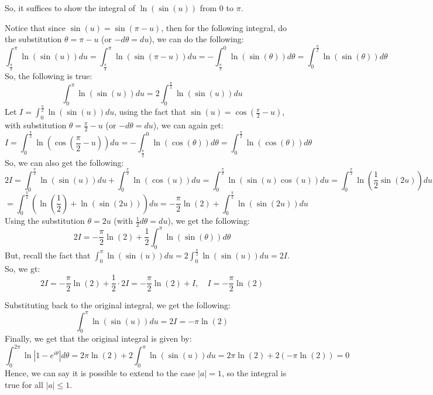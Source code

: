 \documentclass{article}
\begin{document}
So, it suffices to show the integral of $\ln(\sin(u))$ from $0$ to $\pi$.

\hfil

Notice that since $\sin(u)=\sin(\pi-u)$, then for the following integral, do the substitution $\theta=\pi-u$ (or $-d\theta = du$), we can do the following:
$$\int_{\frac{\pi}{2}}^{\pi}\ln(\sin(u))du = \int_{\frac{\pi}{2}}^{\pi}\ln(\sin(\pi-u))du = -\int_{\frac{\pi}{2}}^{0}\ln(\sin(\theta))d\theta = \int_{0}^{\frac{\pi}{2}}\ln(\sin(\theta))d\theta$$
So, the following is true:
$$\int_{0}^{\pi}\ln(\sin(u))du = 2\int_{0}^{\frac{\pi}{2}}\ln(\sin(u))du$$
Let $I=\int_{0}^{\frac{\pi}{2}}\ln(\sin(u))du$, using the fact that $\sin(u)=\cos(\frac{\pi}{2}-u)$, with substitution $\theta=\frac{\pi}{2}-u$ (or $-d\theta=du$), we can again get:
$$I=\int_{0}^{\frac{\pi}{2}}\ln\left(\cos\left(\frac{\pi}{2}-u\right)\right)du = -\int_{\frac{\pi}{2}}^{0}\ln(\cos(\theta))d\theta = \int_{0}^{\frac{\pi}{2}}\ln(\cos(\theta))d\theta$$
So, we can also get the following:
$$2I=\int_{0}^{\frac{\pi}{2}}\ln(\sin(u))du+\int_{0}^{\frac{\pi}{2}}\ln(\cos(u))du = \int_{0}^{\frac{\pi}{2}}\ln(\sin(u)\cos(u))du = \int_{0}^{\frac{\pi}{2}}\ln\left(\frac{1}{2}\sin(2u)\right)du$$
$$=\int_{0}^{\frac{\pi}{2}}\left(\ln\left(\frac{1}{2}\right)+\ln(\sin(2u))\right)du = -\frac{\pi}{2}\ln(2) + \int_{0}^{\frac{\pi}{2}}\ln(\sin(2u))du$$
Using the substitution $\theta=2u$ (with $\frac{1}{2}d\theta=du$), we get the following:
$$2I = -\frac{\pi}{2}\ln(2)+\frac{1}{2}\int_{0}^{\pi}\ln(\sin(\theta))d\theta$$
But, recall the fact that $\int_{0}^{\pi}\ln(\sin(u))du = 2\int_{0}^{\frac{\pi}{2}}\ln(\sin(u))du = 2I$. So, we gt:
$$2I=-\frac{\pi}{2}\ln(2)+\frac{1}{2}\cdot 2I = -\frac{\pi}{2}\ln(2)+I,\quad I=-\frac{\pi}{2}\ln(2)$$

Substituting back to the original integral, we get the following:
$$\int_{0}^{\pi}\ln(\sin(u))du = 2I = -\pi\ln(2)$$
Finally, we get that the original integral is given by:
$$\int_{0}^{2\pi}\ln|1-e^{i\theta}|d\theta = 2\pi\ln(2) + 2\int_{0}^{\pi}\ln(\sin(u))du = 2\pi\ln(2)+2(-\pi\ln(2))=0$$
Hence, we can say it is possible to extend to the case $|a|=1$, so the integral is true for all $|a|\leq 1$.
\end{document}
